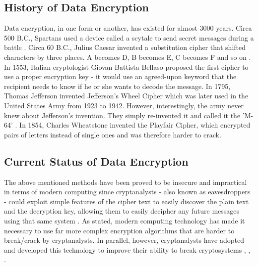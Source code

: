 \documentclass[journal]{IEEEtran}
\begin{document}
\subsection{\textbf{History of Data Encryption}}
Data encryption, in one form or another, has existed for almost 3000 years. Circa 500 B.C., Spartans used a device called a scytale to send secret messages during a battle \cite{encryption_research}. Circa 60 B.C., Julius Caesar invented a substitution cipher that shifted characters by three places. A becomes D, B becomes E, C becomes F and so on \cite{encryption_research}. In 1553, Italian cryptologist Giovan Battista Bellaso proposed the first cipher to use a proper encryption key - it would use an agreed-upon keyword that the recipient needs to know if he or she wants to decode the message. In 1795, Thomas Jefferson invented Jefferson's Wheel Cipher which was later used in the United States Army from 1923 to 1942. However, interestingly, the army never knew about Jefferson's invention. They simply re-invented it and called it the 'M-64' \cite{encryption_research}. In 1854, Charles Wheatstone invented the Playfair Cipher, which encrypted pairs of letters instead of single ones and was therefore harder to crack.

\subsection{\textbf{Current Status of Data Encryption}}
The above mentioned methods have been proved to be insecure and impractical in terms of modern computing since cryptanalysts - also known as eavesdroppers - could exploit simple features of the cipher text to easily discover the plain text and the decryption key, allowing them to easily decipher any future messages using that same system \cite{encryption_today}. As stated, modern computing technology has made it necessary to use far more complex encryption algorithms that are harder to break/crack by cryptanalysts. In parallel, however, cryptanalysts have adopted and developed this technology to improve their ability to break cryptosystems \cite{des_cryptanalysis}, \cite{rijndael_cryptanalysis}, \cite{rsa_cryptanalysis}. 
\end{document}
